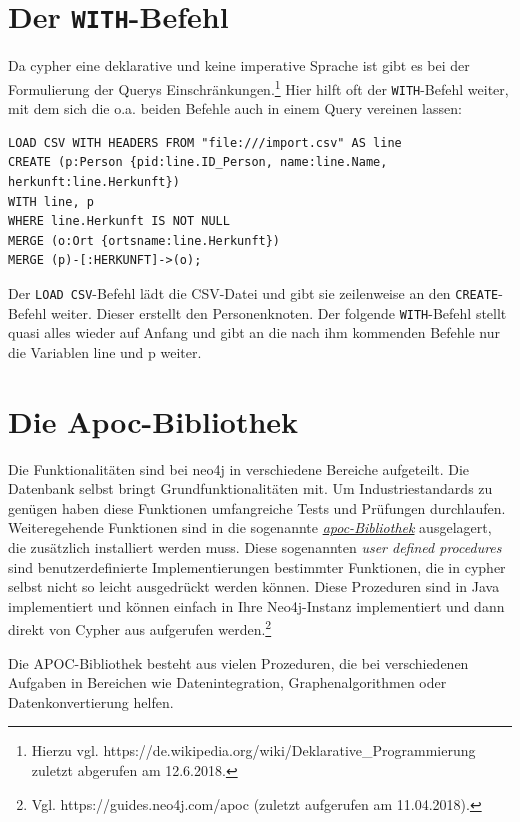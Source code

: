 \documentclass[ngerman,]{scrreprt}
\begin{document}
\section{\texorpdfstring{Der \texttt{WITH}-Befehl}{Der WITH-Befehl}}\label{der-with-befehl}

Da cypher eine deklarative und keine imperative Sprache ist gibt es bei der Formulierung der Querys Einschränkungen.\footnote{Hierzu vgl. https://de.wikipedia.org/wiki/Deklarative\_Programmierung zuletzt abgerufen am 12.6.2018.} Hier hilft oft der \texttt{WITH}-Befehl weiter, mit dem sich die o.a. beiden Befehle auch in einem Query vereinen lassen:

\begin{verbatim}
LOAD CSV WITH HEADERS FROM "file:///import.csv" AS line
CREATE (p:Person {pid:line.ID_Person, name:line.Name, herkunft:line.Herkunft})
WITH line, p
WHERE line.Herkunft IS NOT NULL
MERGE (o:Ort {ortsname:line.Herkunft})
MERGE (p)-[:HERKUNFT]->(o);
\end{verbatim}

Der \texttt{LOAD\ CSV}-Befehl lädt die CSV-Datei und gibt sie zeilenweise an den \texttt{CREATE}-Befehl weiter. Dieser erstellt den Personenknoten. Der folgende \texttt{WITH}-Befehl stellt quasi alles wieder auf Anfang und gibt an die nach ihm kommenden Befehle nur die Variablen line und p weiter.

\section{Die Apoc-Bibliothek}\label{die-apoc-bibliothek}

Die Funktionalitäten sind bei neo4j in verschiedene Bereiche aufgeteilt. Die Datenbank selbst bringt Grundfunktionalitäten mit. Um Industriestandards zu genügen haben diese Funktionen umfangreiche Tests und Prüfungen durchlaufen. Weiteregehende Funktionen sind in die sogenannte \href{https://guides.neo4j.com/apoc}{\emph{apoc-Bibliothek}} ausgelagert, die zusätzlich installiert werden muss. Diese sogenannten \emph{user defined procedures} sind benutzerdefinierte Implementierungen bestimmter Funktionen, die in cypher selbst nicht so leicht ausgedrückt werden können. Diese Prozeduren sind in Java implementiert und können einfach in Ihre Neo4j-Instanz implementiert und dann direkt von Cypher aus aufgerufen werden.\footnote{Vgl. https://guides.neo4j.com/apoc (zuletzt aufgerufen am 11.04.2018).}

Die APOC-Bibliothek besteht aus vielen Prozeduren, die bei verschiedenen Aufgaben in Bereichen wie Datenintegration, Graphenalgorithmen oder Datenkonvertierung helfen.
\end{document}
